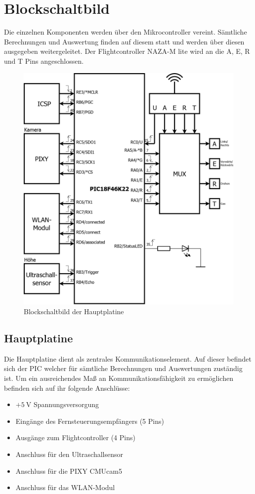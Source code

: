 \section{Blockschaltbild}
Die einzelnen Komponenten werden über den Mikrocontroller vereint. Sämtliche Berechnungen und Auswertung finden auf diesem statt und werden über diesen ausgegeben \bzw
weitergeleitet. Der Flightcontroller NAZA-M lite wird an die A, E, R und T Pins angeschlossen.
\begin{figure}[H]
  \begin{centering}
    \includegraphics[width = 1\textwidth]{Bilder/Blockschaltbild}
  \par\end{centering}
  \caption{Blockschaltbild der Hauptplatine}
  \label{Blockschaltbild}
\end{figure}

  \subsection{Hauptplatine}
  Die Hauptplatine dient als zentrales Kommunikationselement. Auf dieser befindet sich der PIC welcher für sämtliche Berechnungen und Auswertungen zuständig ist.
  Um ein ausreichendes Maß an Kommunikationsfähigkeit zu ermöglichen befinden sich auf ihr folgende Anschlüsse:
  \begin{itemize}
    \item $+\SI{5}{\volt}$ Spannungsversorgung
    \item Eingänge des Fernsteuerungsempfängers (5 Pins)
    \item Ausgänge zum Flightcontroller (4 Pins)
    \item Anschluss für den Ultraschallsensor
    \item Anschluss für die PIXY CMUcam5
    \item Anschluss für das WLAN-Modul
  \end{itemize}

